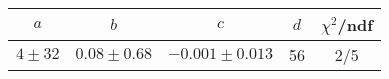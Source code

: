 \begin{tabular}{c|c|c|c|c}
$a$ & $b$ & $c$ & $d$ & $\chi^2$/ndf \\
\hline
$4\pm32$ & $0.08\pm0.68$ & $-0.001\pm0.013$ & 56 & 2/5
\end{tabular}
